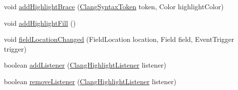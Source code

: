\begin{DoxyCompactItemize}
\item 
void \mbox{\hyperlink{classghidra_1_1app_1_1decompiler_1_1component_1_1_clang_highlight_controller_a5e8c11782f11a49ec54b398220970c06}{add\+Highlight\+Brace}} (\mbox{\hyperlink{classghidra_1_1app_1_1decompiler_1_1_clang_syntax_token}{Clang\+Syntax\+Token}} token, Color highlight\+Color)
\item 
void \mbox{\hyperlink{classghidra_1_1app_1_1decompiler_1_1component_1_1_clang_highlight_controller_a24a9a5eca47374398501c91a290d05d4}{add\+Highlight\+Fill}} ()
\item 
void \mbox{\hyperlink{classghidra_1_1app_1_1decompiler_1_1component_1_1_clang_highlight_controller_a2a0cb731486fb81e3ba5f30a1df8ede9}{field\+Location\+Changed}} (Field\+Location location, Field field, Event\+Trigger trigger)
\item 
boolean \mbox{\hyperlink{classghidra_1_1app_1_1decompiler_1_1component_1_1_clang_highlight_controller_a1f995ddaa7172fc70cffc4f408882c05}{add\+Listener}} (\mbox{\hyperlink{interfaceghidra_1_1app_1_1decompiler_1_1component_1_1_clang_highlight_listener}{Clang\+Highlight\+Listener}} listener)
\item 
boolean \mbox{\hyperlink{classghidra_1_1app_1_1decompiler_1_1component_1_1_clang_highlight_controller_a7650245d1d0e52c357f7e42b62fdc13c}{remove\+Listener}} (\mbox{\hyperlink{interfaceghidra_1_1app_1_1decompiler_1_1component_1_1_clang_highlight_listener}{Clang\+Highlight\+Listener}} listener)
\end{DoxyCompactItemize}
